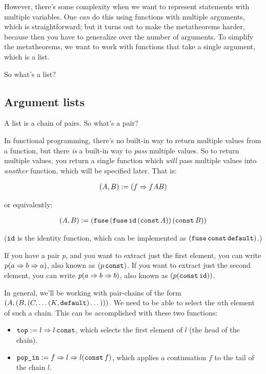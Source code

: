 \documentclass{article}
\begin{document}
  However, there's some complexity when we want to represent statements with multiple variables. One \emph{can} do this using functions with multiple arguments, which is straightforward; but it turns out to make the metatheorems harder, because then you have to generalize over the number of arguments. To simplify the metatheorems, we want to work with functions that take a single argument, which is a list.
  
  So what's a list?
  
  \subsection{Argument lists}
  
  A list is a chain of pairs. So what's a pair?
  
  In functional programming, there's no built-in way to return multiple values from a function, but there \emph{is} a built-in way to \emph{pass} multiple values. So to return multiple values, you return a single function which \emph{will} pass multiple values into \emph{another} function, which will be specified later. That is:
  
  \begin{align*}
    (A, B) &:= (f \Rightarrow f A B)\\
  \end{align*}
  
  or equivalently:
  
  \begin{align*}
    (A, B) &:= (\operatorname{\texttt{fuse}}\, (\operatorname{\texttt{fuse}} \operatorname{\texttt{id}}\, (\operatorname{\texttt{const}} A))\, (\operatorname{\texttt{const}} B))\\
  \end{align*}
  
  ($\operatorname{\texttt{id}}$ is the identity function, which can be implemented as $(\operatorname{\texttt{fuse}}\operatorname{\texttt{const}}\operatorname{\texttt{default}})$.)
  
  If you have a pair $p$, and you want to extract just the first element, you can write $p(a \Rightarrow b \Rightarrow a)$, also known as $(p \operatorname{\texttt{const}})$. If you want to extract just the second element, you can write $p(a \Rightarrow b \Rightarrow b)$, also known as $(p (\operatorname{\texttt{const}} \operatorname{\texttt{id}}))$.
  
  In general, we'll be working with pair-chains of the form $(A, (B, (C, \dots (K, \operatorname{\texttt{default}}) \dots)))$. We need to be able to select the $n$th element of such a chain. This can be accomplished with these two functions:
  
  \begin{itemize}
    \item $\operatorname{\texttt{top}} := l \Rightarrow l \operatorname{\texttt{const}}$, which selects the first element of $l$ (the head of the chain).
    \item $\operatorname{\texttt{pop\_in}} := f \Rightarrow l \Rightarrow l (\operatorname{\texttt{const}} f)$, which applies a continuation $f$ to the tail of the chain $l$.
  \end{itemize}
  
\end{document}
